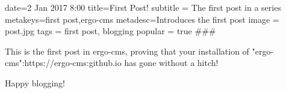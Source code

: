 date=2 Jan 2017 8:00
title=First Post!
subtitle = The first post in a series
metakeys=first post,ergo-cms
metadesc=Introduces the first post
image = post.jpg
tags = first post, blogging
popular = true
###

This is the first post in ergo-cms, proving that your installation of "ergo-cms":https://ergo-cms:github.io has gone without a hitch!

Happy blogging!

